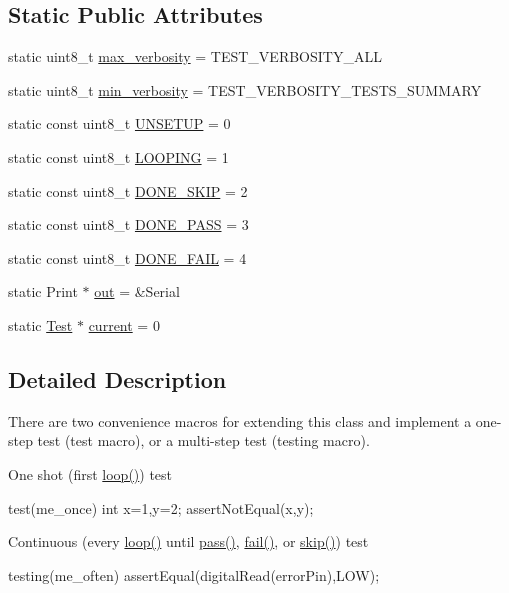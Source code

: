 \subsection*{Static Public Attributes}
\begin{DoxyCompactItemize}
\item 
static uint8\-\_\-t \hyperlink{class_test_aad3dc21628f5210b9ebdf843eb2b2ae0}{max\-\_\-verbosity} = T\-E\-S\-T\-\_\-\-V\-E\-R\-B\-O\-S\-I\-T\-Y\-\_\-\-A\-L\-L
\item 
static uint8\-\_\-t \hyperlink{class_test_a1ff0e4cf27254c988233880fff9e6c6d}{min\-\_\-verbosity} = T\-E\-S\-T\-\_\-\-V\-E\-R\-B\-O\-S\-I\-T\-Y\-\_\-\-T\-E\-S\-T\-S\-\_\-\-S\-U\-M\-M\-A\-R\-Y
\item 
static const uint8\-\_\-t \hyperlink{class_test_a73b64ff82076551c6a66f17bed82c1b4}{U\-N\-S\-E\-T\-U\-P} = 0
\item 
static const uint8\-\_\-t \hyperlink{class_test_ad547575fc6e8ad71bb39542c1abeb7fd}{L\-O\-O\-P\-I\-N\-G} = 1
\item 
static const uint8\-\_\-t \hyperlink{class_test_af7ee7b197c214e110e13537bc0b277e2}{D\-O\-N\-E\-\_\-\-S\-K\-I\-P} = 2
\item 
static const uint8\-\_\-t \hyperlink{class_test_ab1a131191af040400d33ea8f8b2c25af}{D\-O\-N\-E\-\_\-\-P\-A\-S\-S} = 3
\item 
static const uint8\-\_\-t \hyperlink{class_test_a4ad0055670d3ae4babadc094002c17fd}{D\-O\-N\-E\-\_\-\-F\-A\-I\-L} = 4
\item 
static Print $\ast$ \hyperlink{class_test_a33e59751992ec1a8a65745c0b6b144b0}{out} = \&Serial
\item 
static \hyperlink{class_test}{Test} $\ast$ \hyperlink{class_test_ab33c60d07c2338204a0bafe40f995177}{current} = 0
\end{DoxyCompactItemize}


\subsection{Detailed Description}
There are two convenience macros for extending this class and implement a one-\/step test (test macro), or a multi-\/step test (testing macro).

One shot (first \hyperlink{class_test_a62a1398282c8ef41e33e8f35d165f4b0}{loop()}) test \begin{DoxyVerb}test(me_once) 
{
  int x=1,y=2;
  assertNotEqual(x,y);
}
\end{DoxyVerb}


Continuous (every \hyperlink{class_test_a62a1398282c8ef41e33e8f35d165f4b0}{loop()} until \hyperlink{class_test_a34a0e65e4866bfba400f564e9e76a996}{pass()}, \hyperlink{class_test_a5bf0d4600cf540ccd39c12f91e7173de}{fail()}, or \hyperlink{class_test_af2ff3082a0ea33fa0c0ae1aae143d786}{skip()}) test \begin{DoxyVerb}testing(me_often) {
  assertEqual(digitalRead(errorPin),LOW);
}
\end{DoxyVerb}


